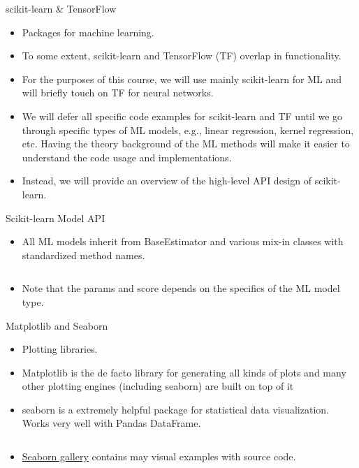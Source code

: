 \documentclass[aspectratio=169]{beamer}
\begin{document}
    \begin{frame}{scikit-learn \& TensorFlow}
        \begin{itemize}
            \item Packages for machine learning.
            \item To some extent, scikit-learn and TensorFlow (TF) overlap in functionality.
            \item For the purposes of this course, we will use mainly scikit-learn for ML and will briefly touch on TF for neural networks.
            \item We will defer all specific code examples for scikit-learn and TF until we go through specific types of ML models, e.g., linear regression, kernel regression, etc. Having the theory background of the ML methods will make it easier to understand the code usage and implementations.
            \item Instead, we will provide an overview of the high-level API design of scikit-learn.
        \end{itemize}
    \end{frame}


    \begin{frame}[fragile]{Scikit-learn Model API}
        \begin{itemize}
            \item All ML models inherit from BaseEstimator and various mix-in classes with standardized method names.
            \inputminted{python}{example_sklearn.py}
            \item Note that the params and score depends on the specifics of the ML model type.
        \end{itemize}
    \end{frame}



    \begin{frame}[fragile]{Matplotlib and Seaborn}
        \begin{itemize}
            \item Plotting libraries.
            \item Matplotlib is the de facto library for generating all kinds of plots and many other plotting engines (including seaborn) are built on top of it
            \item seaborn is a extremely helpful package for statistical data visualization. Works very well with Pandas DataFrame.
            \inputminted{python}{example_plotting.py}
            \item \href{http://seaborn.pydata.org/examples/index.html}{Seaborn gallery} contains may visual examples with source code.
        \end{itemize}
    \end{frame}
\end{document}

